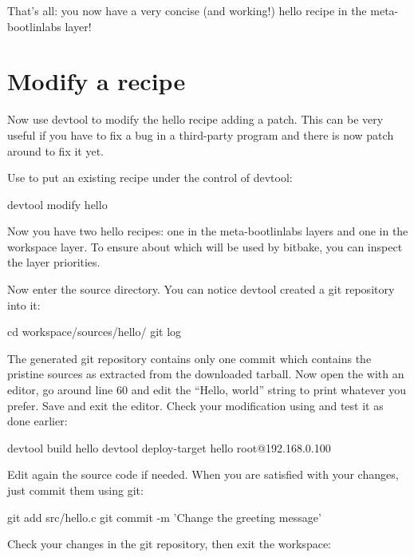 That's all: you now have a very concise (and working!) hello recipe in the
meta-bootlinlabs layer!

\section{Modify a recipe}

Now use devtool to modify the hello recipe adding a patch. This can be very
useful if you have to fix a bug in a third-party program and there is now
patch around to fix it yet.

Use  to put an existing recipe under the control of devtool:
\begin{bashinput}
devtool modify hello
\end{bashinput}

Now you have two hello recipes: one in the meta-bootlinlabs layers and one
in the workspace layer. To ensure about which will be used by bitbake, you
can inspect the layer priorities.

Now enter the source directory. You can notice devtool created a git
repository into it:

\begin{bashinput}
cd workspace/sources/hello/
git log
\end{bashinput}

The generated git repository contains only one commit which contains
the pristine sources as extracted from the downloaded tarball.  Now open the
 with an editor, go around line 60 and edit the ``Hello,
world'' string to print whatever you prefer. Save and exit the
editor. Check your modification using  and
test it as done earlier:

\begin{bashinput}
devtool build hello
devtool deploy-target hello root@192.168.0.100
\end{bashinput}

Edit again the source code if needed. When you are satisfied with your
changes, just commit them using git:

\begin{bashinput}
git add src/hello.c
git commit -m 'Change the greeting message'
\end{bashinput}

Check your changes in the git repository, then exit the workspace:


